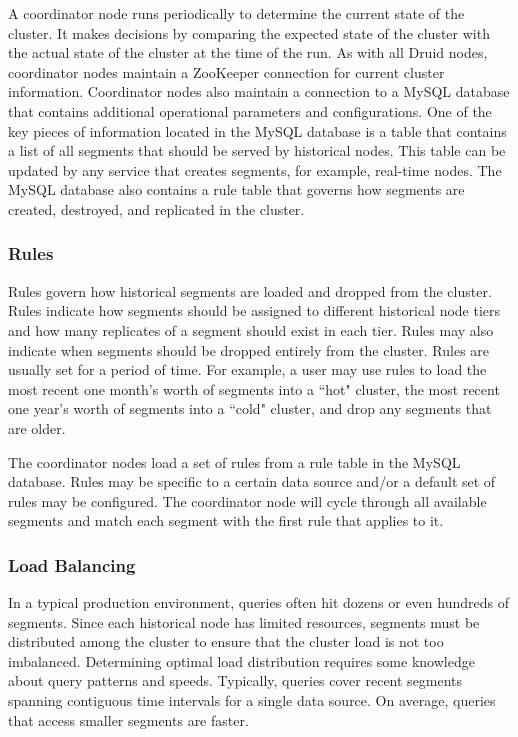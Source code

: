 \documentclass{sig-alternate-2013}
\begin{document}
A coordinator node runs periodically to determine the current state of the
cluster. It makes decisions by comparing the expected state of the cluster with
the actual state of the cluster at the time of the run. As with all Druid
nodes, coordinator nodes maintain a ZooKeeper connection for current cluster
information. Coordinator nodes also maintain a connection to a MySQL
database that contains additional operational parameters and configurations.
One of the key pieces of information located in the MySQL database is a table
that contains a list of all segments that should be served by historical nodes.
This table can be updated by any service that creates segments, for example,
real-time nodes. The MySQL database also contains a rule table that governs how
segments are created, destroyed, and replicated in the cluster.

\subsubsection{Rules}
Rules govern how historical segments are loaded and dropped from the cluster.
Rules indicate how segments should be assigned to different historical node
tiers and how many replicates of a segment should exist in each tier. Rules may
also indicate when segments should be dropped entirely from the cluster. Rules
are usually set for a period of time. For example, a user may use rules to
load the most recent one month's worth of segments into a ``hot" cluster, the
most recent one year's worth of segments into a ``cold" cluster, and drop any
segments that are older.

The coordinator nodes load a set of rules from a rule table in the MySQL
database. Rules may be specific to a certain data source and/or a default set
of rules may be configured. The coordinator node will cycle through all available
segments and match each segment with the first rule that applies to it.

\subsubsection{Load Balancing}
In a typical production environment, queries often hit dozens or even hundreds
of segments. Since each historical node has limited resources, segments must be
distributed among the cluster to ensure that the cluster load is not too
imbalanced. Determining optimal load distribution requires some knowledge about
query patterns and speeds. Typically, queries cover recent segments spanning
contiguous time intervals for a single data source. On average, queries that
access smaller segments are faster.
\end{document}
